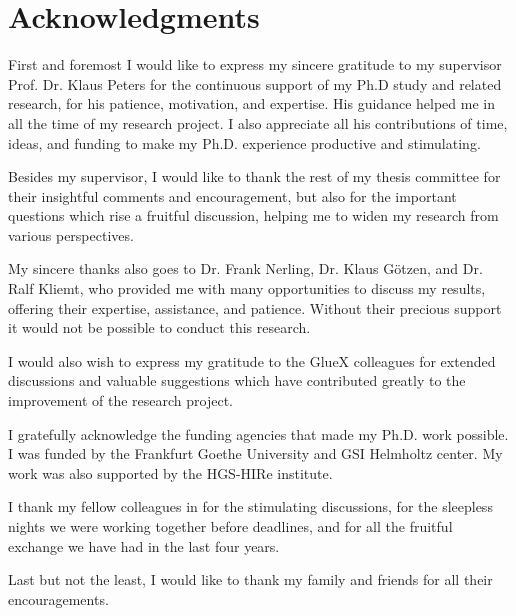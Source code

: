 \section*{Acknowledgments}

First and foremost I would like to express my sincere gratitude to my supervisor Prof. Dr. Klaus Peters for the continuous support of my Ph.D study and related research, for his patience, motivation, and expertise. His guidance helped me in all the time of my research project. I also appreciate all his contributions of time, ideas, and funding to make my Ph.D. experience productive and stimulating.
~\par Besides my supervisor, I would like to thank the rest of my thesis committee for their insightful comments and encouragement, but also for the important questions which rise a fruitful discussion, helping me to widen my research from various perspectives.
~\par My sincere thanks also goes to Dr. Frank Nerling, Dr. Klaus G\"otzen, and Dr. Ralf Kliemt, who provided me with many opportunities to discuss my results, offering their expertise, assistance, and patience. Without their precious support it would not be possible to conduct this research.
~\par I would also wish to express my gratitude to the GlueX colleagues for extended discussions and valuable suggestions which have contributed greatly to the improvement of the research project.
~\par I gratefully acknowledge the funding agencies that made my Ph.D. work possible. I was funded by the Frankfurt Goethe University and GSI Helmholtz center. My work was also supported by the HGS-HIRe institute.
~\par I thank my fellow colleagues in for the stimulating discussions, for the sleepless nights we were working together before deadlines, and for all the fruitful exchange we have had in the last four years.
~\par Last but not the least, I would like to thank my family and friends for all their encouragements.

